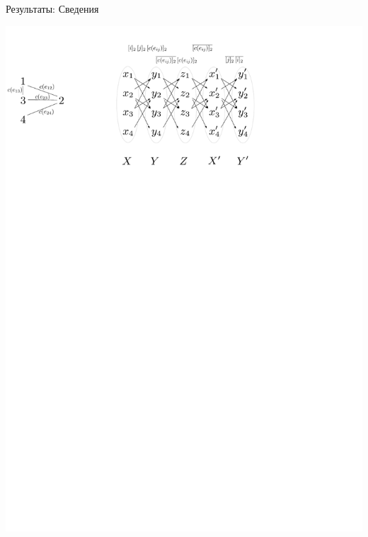 \documentclass{beamer}
\begin{document}
\begin{frame}{Результаты: Сведения}
\begin{itemize}
		\begin{center}
			\includegraphics[scale=0.65]{./pictures/ae-monotr_to_cflr.pdf}
		\end{center}
	\end{itemize}
\end{frame}
\end{document}
